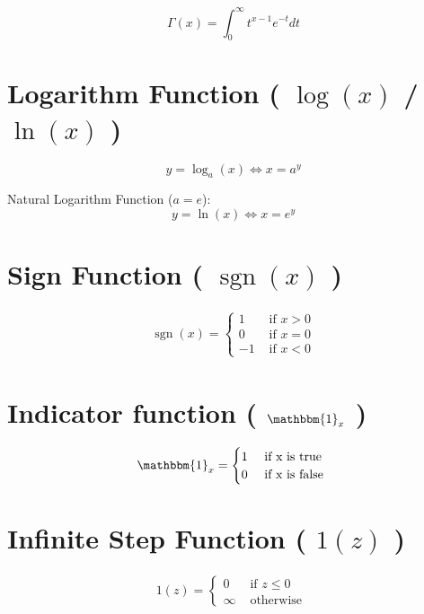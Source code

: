 \[
    \Gamma(x) = \displaystyle\int_{0}^{\infty} t^{x-1} e^{-t} dt
\]


\section{Logarithm Function ( $\log(x)$ / $\ln(x)$ )}\label{Logarithm Function}
\[
    y = \log_a(x) \Leftrightarrow x = a^y
\]

Natural Logarithm Function ($a=e$):
\[
    y = \ln(x) \Leftrightarrow x = e^y
\]


\section{Sign Function ( $\operatorname{sgn}(x)$ )}\label{Sign Function}
\begin{align}
    \operatorname{sgn}(x) = \begin{cases}
         1 & \text{ if } x > 0 \\
         0 & \text{ if } x = 0 \\
         -1 & \text{ if } x < 0 
        \end{cases}
\end{align}



\section{Indicator function ( $\mathbbm{1}_x$ )}\label{Indicator function}

\begin{align}
    \mathbbm{1}_x = {\begin{cases}
        1 & \text{ if x is true } \\
        0 & \text{ if x is false }
    \end{cases}}
\end{align}

\section{Infinite Step Function ( $1(z)$ )}

\begin{align}
    1(z) = {\begin{cases}
        0 & \text{ if } z \leq 0 \\
        \infty & \text{ otherwise }
    \end{cases}}
\end{align}

